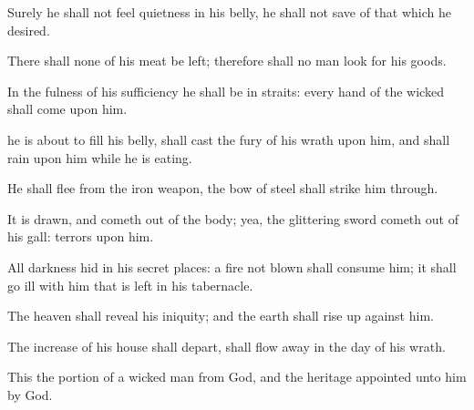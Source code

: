 {Surely he shall not
feel
quietness in his
belly, he shall not
save of that which he
desired.

There shall none of his
meat be
left; therefore shall no man
look for his
goods.

In the
fulness of his
sufficiency he shall be in
straits: every
hand of the
wicked shall
come upon him.


\par }{\PP {} he is about to
fill his
belly,
{} shall
cast the
fury of his
wrath upon him, and shall
rain
{} upon him while he is
eating.

He shall
flee from the
iron
weapon,
{} the
bow of
steel shall strike him
through.

It is
drawn, and cometh
out of the
body; yea, the glittering
sword cometh
out of his
gall:
terrors
{} upon him.

All
darkness
{}
hid in his secret
places: a
fire not
blown shall
consume him; it shall go
ill with him that is
left in his
tabernacle.

The
heaven shall
reveal his
iniquity; and the
earth shall rise
up against him.

The
increase of his
house shall
depart,
{} shall flow
away in the
day of his
wrath.

This
{} the
portion of a
wicked
man from
God, and the
heritage
appointed unto him by
God.




\par }
